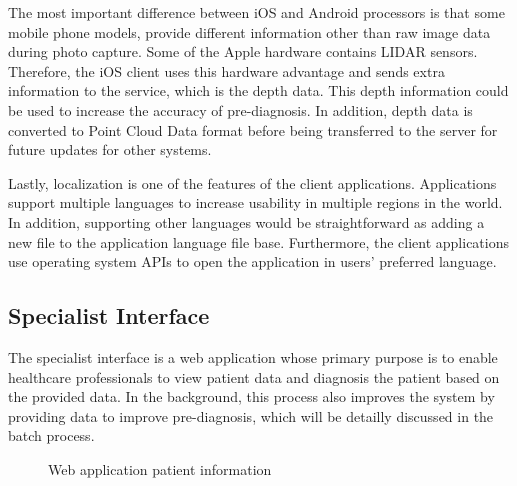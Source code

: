 The most important difference between iOS and Android processors is that some mobile phone models, provide different information other than raw image data during photo capture. Some of the Apple hardware contains LIDAR sensors. Therefore, the iOS client uses this hardware advantage and sends extra information to the service, which is the depth data. This depth information could be used to increase the accuracy of pre-diagnosis. In addition, depth data is converted to Point Cloud Data format before being transferred to the server for future updates for other systems.

Lastly, localization is one of the features of the client applications. Applications support multiple languages to increase usability in multiple regions in the world. In addition, supporting other languages would be straightforward as adding a new file to the application language file base. Furthermore, the client applications use operating system APIs to open the application in users' preferred language.

\subsection{Specialist Interface} \label{sec:SpecialistInterface}

The specialist interface is a web application whose primary purpose is to enable healthcare professionals to view patient data and diagnosis the patient based on the provided data. In the background, this process also improves the system by providing data to improve pre-diagnosis, which will be detailly discussed in the batch process. 

\begin{figure}[htbp]
\centering
{}
\caption{Web application patient information}
\label{fig:WebApplicationPatientInfo}
\end{figure}

